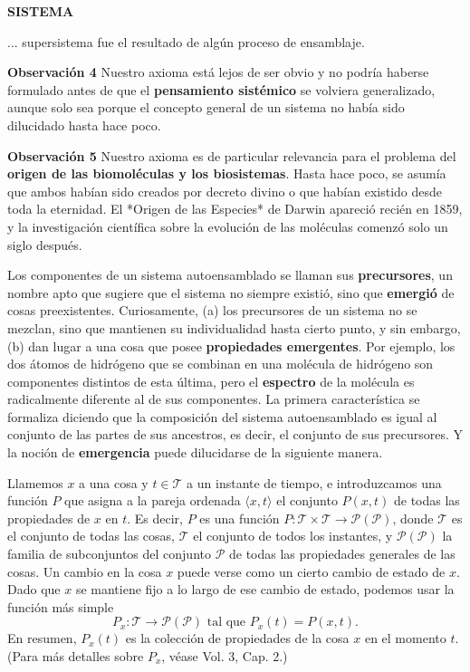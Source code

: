 \newpage
\fancyhf{}
\fancyhead[r]{\thepage}
\begin{center}
{\fontsize{13}{16}\selectfont \textbf{SISTEMA}}
\end{center}
\vspace{0.5cm}

{\fontsize{13}{15}\selectfont
... supersistema fue el resultado de algún proceso de ensamblaje.

\textbf{Observación 4} Nuestro axioma está lejos de ser obvio y no podría haberse formulado antes de que el \textbf{pensamiento sistémico} se volviera generalizado, aunque solo sea porque el concepto general de un sistema no había sido dilucidado hasta hace poco.

\textbf{Observación 5} Nuestro axioma es de particular relevancia para el problema del \textbf{origen de las biomoléculas y los biosistemas}. Hasta hace poco, se asumía que ambos habían sido creados por decreto divino o que habían existido desde toda la eternidad. El *Origen de las Especies* de Darwin apareció recién en 1859, y la investigación científica sobre la evolución de las moléculas comenzó solo un siglo después.

Los componentes de un sistema autoensamblado se llaman sus \textbf{precursores}, un nombre apto que sugiere que el sistema no siempre existió, sino que \textbf{emergió} de cosas preexistentes. Curiosamente, (a) los precursores de un sistema no se mezclan, sino que mantienen su individualidad hasta cierto punto, y sin embargo, (b) dan lugar a una cosa que posee \textbf{propiedades emergentes}. Por ejemplo, los dos átomos de hidrógeno que se combinan en una molécula de hidrógeno son componentes distintos de esta última, pero el \textbf{espectro} de la molécula es radicalmente diferente al de sus componentes. La primera característica se formaliza diciendo que la composición del sistema autoensamblado es igual al conjunto de las partes de sus ancestros, es decir, el conjunto de sus precursores. Y la noción de \textbf{emergencia} puede dilucidarse de la siguiente manera.

Llamemos $x$ a una cosa y $t \in \mathcal{T}$ a un instante de tiempo, e introduzcamos una función $P$ que asigna a la pareja ordenada $\langle x, t \rangle$ el conjunto $P(x, t)$ de todas las propiedades de $x$ en $t$. Es decir, $P$ es una función $P: \mathcal{T} \times \mathcal{T} \rightarrow \mathcal{P}(\mathcal{P})$, donde $\mathcal{T}$ es el conjunto de todas las cosas, $\mathcal{T}$ el conjunto de todos los instantes, y $\mathcal{P}(\mathcal{P})$ la familia de subconjuntos del conjunto $\mathcal{P}$ de todas las propiedades generales de las cosas. Un cambio en la cosa $x$ puede verse como un cierto cambio de estado de $x$. Dado que $x$ se mantiene fijo a lo largo de ese cambio de estado, podemos usar la función más simple
$$ P_x: \mathcal{T} \longrightarrow \mathcal{P}(\mathcal{P}) \text{ tal que } P_x(t) = P(x, t). $$
En resumen, $P_x(t)$ es la colección de propiedades de la cosa $x$ en el momento $t$. (Para más detalles sobre $P_x$, véase Vol. 3, Cap. 2.)

}
